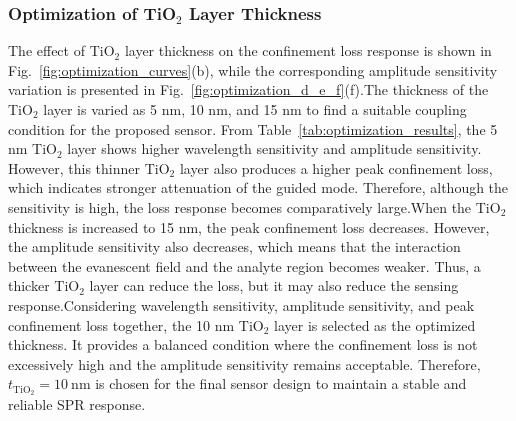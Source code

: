 \documentclass[preprint,12pt]{elsarticle}
\begin{document}
\subsubsection{\textbf{Optimization of TiO$_2$ Layer Thickness}}
The effect of TiO$_2$ layer thickness on the confinement loss response is shown in Fig.~\ref{fig:optimization_curves}(b), while the corresponding amplitude sensitivity variation is presented in Fig.~\ref{fig:optimization_d_e_f}(f).The thickness of the TiO$_2$ layer is varied as 5 nm, 10 nm, and 15 nm to find a suitable coupling condition for the proposed sensor. From Table~\ref{tab:optimization_results}, the 5 nm TiO$_2$ layer shows higher wavelength sensitivity and amplitude sensitivity. However, this thinner TiO$_2$ layer also produces a higher peak confinement loss, which indicates stronger attenuation of the guided mode. Therefore, although the sensitivity is high, the loss response becomes comparatively large.When the TiO$_2$ thickness is increased to 15 nm, the peak confinement loss decreases. However, the amplitude sensitivity also decreases, which means that the interaction between the evanescent field and the analyte region becomes weaker. Thus, a thicker TiO$_2$ layer can reduce the loss, but it may also reduce the sensing response.Considering wavelength sensitivity, amplitude sensitivity, and peak confinement loss together, the 10 nm TiO$_2$ layer is selected as the optimized thickness. It provides a balanced condition where the confinement loss is not excessively high and the amplitude sensitivity remains acceptable. Therefore, $t_{\mathrm{TiO_2}} = 10~\mathrm{nm}$ is chosen for the final sensor design to maintain a stable and reliable SPR response.
\end{document}
